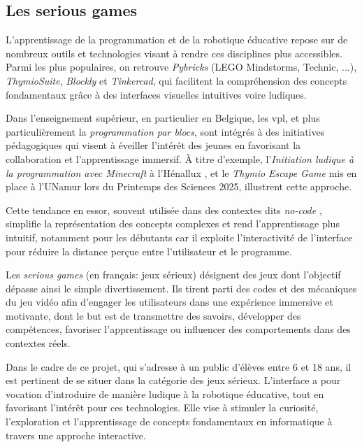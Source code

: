 \subsection{Les serious games} \label{sec:serious_game}
L’apprentissage de la programmation et de la robotique éducative repose sur de nombreux outils et technologies visant à rendre ces disciplines plus accessibles.
Parmi les plus populaires, on retrouve \textit{Pybricks} (LEGO Mindstorms, Technic, ...), \textit{ThymioSuite}, \textit{Blockly} et \textit{Tinkercad}, qui facilitent la compréhension des concepts fondamentaux grâce à des interfaces visuelles intuitives voire ludiques. 

Dans l'enseignement supérieur, en particulier en Belgique, les \acrfull{vpl}, et plus particulièrement la \textit{programmation par blocs}, sont intégrés à des initiatives pédagogiques qui visent à éveiller l’intérêt des jeunes en favorisant la collaboration et l'apprentissage immersif.
À titre d’exemple, l’\textit{Initiation ludique à la programmation avec Minecraft} à l’Hénallux \autocite{christophe_leclere_initiation_2020}, et le \textit{Thymio Escape Game} \autocite{christian_giang_thymio_nodate} mis en place à l’UNamur lors du Printemps des Sciences 2025, illustrent cette approche.

Cette tendance en essor, souvent utilisée dans des contextes dits \textit{no-code} \autocites{noauthor_software_nodate}, simplifie la représentation des concepts complexes et rend l’apprentissage plus intuitif, notamment pour les débutants \autocites{noauthor_visual_2025}{batni_current_2025} car il exploite l’interactivité de l’interface pour réduire la distance perçue entre l’utilisateur et le programme.

Les \textit{serious games} (en français: jeux sérieux) désignent des jeux dont l'objectif dépasse ainsi le simple divertissement.
Ils tirent parti des codes et des mécaniques du jeu vidéo afin d’engager les utilisateurs dans une expérience immersive et motivante, dont le but est de transmettre des savoirs, développer des compétences, favoriser l’apprentissage ou influencer des comportements dans des contextes réels.

Dans le cadre de ce projet, qui s’adresse à un public d’élèves entre 6 et 18 ans, il est pertinent de se situer dans la catégorie des jeux sérieux.
L’interface a pour vocation d’introduire de manière ludique à la robotique éducative, tout en favorisant l’intérêt pour ces technologies. 
Elle vise à stimuler la curiosité, l’exploration et l’apprentissage de concepts fondamentaux en informatique à travers une approche interactive.

